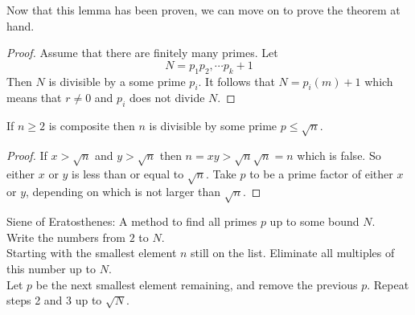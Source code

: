 \documentclass{article}
\theoremstyle{definition}
\begin{document}
Now that this lemma has been proven, we can move on to prove the theorem at hand.
\begin{proof}
    Assume that there are finitely many primes.
    Let 
    \[
        N = p_1p_2, \cdots p_k + 1
    \]
    Then $N$ is divisible by a some prime $p_i$. It follows that 
    $N = p_i(m) + 1$ which means that $r \neq 0$ and $p_i$ does not divide $N$. 
\end{proof}
If $n \geqslant 2$ is composite then $n$ is divisible by some prime $p \leqslant \sqrt{n}$.
\begin{proof}
    If $x > \sqrt{n}$ and $y > \sqrt{n}$ then $n = xy > \sqrt{n}\sqrt{n} = n$ which is false.
    So either $x$ or $y$ is less than or equal to $\sqrt{n}$. Take $p$ to be a prime factor of either $x$ or $y$,
    depending on which is not larger than $\sqrt{n}$.
\end{proof}
\begin{mdframed}[]
    Siene of Eratosthenes: A method to find all primes $p$ up to some bound $N$.\\
     Write the numbers from $2$ to $N$.\\
     Starting with the smallest element $n$ still on the list. Eliminate all multiples of this number up to $N$.\\
     Let $p$ be the next smallest element remaining, and remove the previous $p$.
     Repeat steps 2 and 3 up to $\sqrt{N}$.
\end{mdframed}
\end{document}
